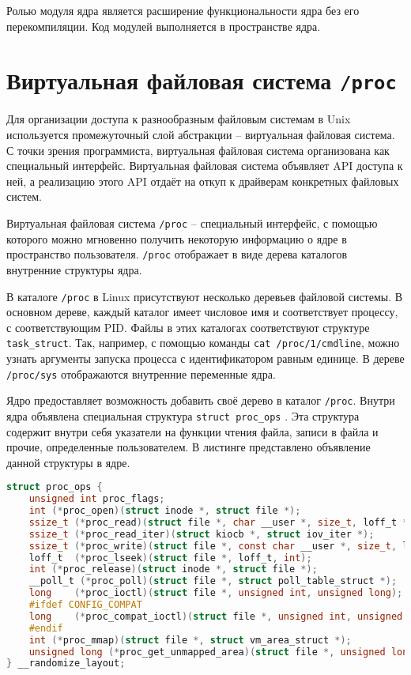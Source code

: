 Ролью модуля ядра является расширение функциональности ядра без его перекомпиляции. Код модулей выполняется в пространстве ядра.

\section{Виртуальная файловая система \texttt{/proc}}

Для организации доступа к разнообразным файловым системам в Unix используется промежуточный слой абстракции -- виртуальная файловая система. С точки зрения программиста, виртуальная файловая система организована как специальный интерфейс. Виртуальная файловая система объявляет API доступа к ней, а реализацию этого API отдаёт на откуп к драйверам конкретных файловых систем.

Виртуальная файловая система \texttt{/proc} -- специальный интерфейс, с помощью которого можно мгновенно получить некоторую информацию о ядре в пространство пользователя. \texttt{/proc} отображает в виде дерева каталогов внутренние структуры ядра. 

В каталоге \texttt{/proc} в Linux присутствуют несколько деревьев файловой системы. В основном дереве, каждый каталог имеет числовое имя и соответствует процессу, с соответствующим PID. Файлы в этих каталогах соответствуют структуре \texttt{task\_struct}. Так, например, с помощью команды \texttt{cat /proc/1/cmdline}, можно узнать аргументы запуска процесса с идентификатором равным единице. В дереве \texttt{/proc/sys} отображаются внутренние переменные ядра.

Ядро предоставляет возможность добавить своё дерево в каталог \texttt{/proc}. Внутри ядра объявлена специальная структура \texttt{struct proc\_ops} \cite{proc-ops}. Эта структура содержит внутри себя указатели на функции чтения файла, записи в файла и прочие, определенные пользователем. В листинге \cite{lst:procops} представлено объявление данной структуры в ядре.

\begin{lstlisting}[label=lst:procops, caption=Листинг структуры \texttt{struct sysinfo}, language=c]
struct proc_ops {
	unsigned int proc_flags;
	int	(*proc_open)(struct inode *, struct file *);
	ssize_t	(*proc_read)(struct file *, char __user *, size_t, loff_t *);
	ssize_t (*proc_read_iter)(struct kiocb *, struct iov_iter *);
	ssize_t	(*proc_write)(struct file *, const char __user *, size_t, loff_t *);
	loff_t	(*proc_lseek)(struct file *, loff_t, int);
	int	(*proc_release)(struct inode *, struct file *);
	__poll_t (*proc_poll)(struct file *, struct poll_table_struct *);
	long	(*proc_ioctl)(struct file *, unsigned int, unsigned long);
	#ifdef CONFIG_COMPAT
	long	(*proc_compat_ioctl)(struct file *, unsigned int, unsigned long);
	#endif
	int	(*proc_mmap)(struct file *, struct vm_area_struct *);
	unsigned long (*proc_get_unmapped_area)(struct file *, unsigned long, unsigned long, unsigned long, unsigned long);
} __randomize_layout;
\end{lstlisting}


